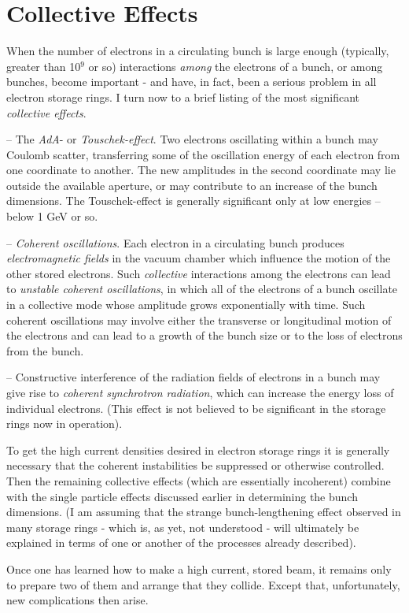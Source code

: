 \section{Collective Effects} \label{sec:1.3}
When the number of electrons in a circulating bunch is large enough (typically, greater than 10$^9$ or so) interactions \emph{among} the electrons of a bunch, or among bunches, become important - and have, in fact, been a serious problem in all electron storage rings. I turn now to a brief listing of the most significant \emph{collective effects}.

-- The \emph{AdA}- or \emph{Touschek-effect}. Two electrons oscillating within a bunch may Coulomb scatter, transferring some of the oscillation energy of each electron from one coordinate to another. The new amplitudes in the second coordinate may lie outside the available aperture, or may contribute to an increase of the bunch dimensions. The Touschek-effect is generally significant only at low energies -- below 1 GeV or so.

-- \emph{Coherent oscillations}. Each electron in a circulating bunch produces \emph{electromagnetic fields} in the vacuum chamber which influence the motion of the other stored electrons. Such \emph{collective} interactions among the electrons can lead to \emph{unstable coherent oscillations}, in which all of the electrons of a bunch oscillate in a collective mode whose amplitude grows exponentially with time. Such coherent oscillations may involve either the transverse or longitudinal motion of the electrons and can lead to a growth of the bunch size or to the loss of electrons from the bunch.

-- Constructive interference of the radiation fields of electrons in a bunch may give rise to \emph{coherent synchrotron radiation}, which can increase the energy loss of individual electrons. (This effect is not believed to be significant in the storage rings now in operation).

To get the high current densities desired in electron storage rings it is generally necessary that the coherent instabilities be suppressed or otherwise controlled. Then the remaining collective effects (which are essentially incoherent) combine with the single particle effects discussed earlier in determining the bunch dimensions. (I am assuming that the strange bunch-lengthening effect observed in many storage rings - which is, as yet, not understood - will ultimately be explained in terms of one or another of the processes already described).

Once one has learned how to make a high current, stored beam, it remains only to prepare two of them and arrange that they collide. Except that, unfortunately, new complications then arise.



